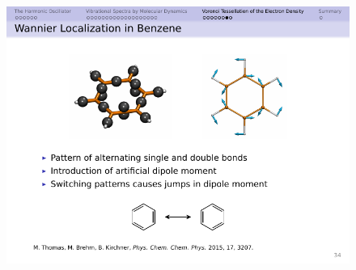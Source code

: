 \documentclass[t]{beamer}
\begin{document}
\begin{frame}
\begin{columns}
\begin{figure}
			\includegraphics[width=.6\textwidth]{figures/benzene_mesomerie.pdf}
		\end{figure}
	\end{columns}
\end{frame}
\end{document}
